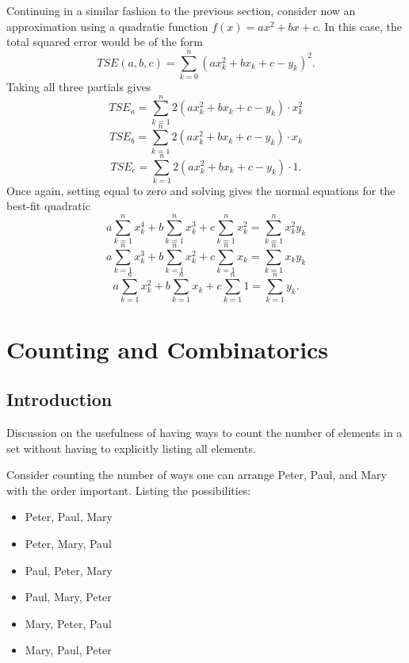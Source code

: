 \documentclass[10pt,]{book}
\theoremstyle{plain}
\theoremstyle{definition}
\theoremstyle{definition}
\theoremstyle{definition}
\numberwithin{equation}{section}
\begin{document}
Continuing in a similar fashion to the previous section, consider now an approximation using a quadratic function \(f(x) = ax^2 + bx + c\).  In this case, the total squared error would be of the form
\begin{equation*}TSE(a,b,c) = \sum_{k=0}^n (a x_k^2 + b x_k + c - y_k)^2.\end{equation*}
Taking all three partials gives
\begin{equation*}TSE_a = \sum_{k=1}^n 2(a x_k^2 + b x_k + c - y_k) \cdot x_k^2\end{equation*}
\begin{equation*}TSE_b = \sum_{k=1}^n 2(a x_k^2 + b x_k + c - y_k) \cdot x_k\end{equation*}
\begin{equation*}TSE_c = \sum_{k=1}^n 2(a x_k^2 + b x_k + c - y_k) \cdot 1 .\end{equation*}
Once again, setting equal to zero and solving gives the normal equations for the best-fit quadratic
\begin{equation*}a \sum_{k=1}^n x_k^4 + b \sum_{k=1}^n x_k^3 + c \sum_{k=1}^n x_k^2 = \sum_{k=1}^n x_k^2 y_k\end{equation*}
\begin{equation*}a \sum_{k=1}^n x_k^3 + b \sum_{k=1}^n x_k^2 + c \sum_{k=1}^n x_k = \sum_{k=1}^n x_k y_k\end{equation*}
\begin{equation*}a \sum_{k=1}^n x_k^2 + b \sum_{k=1}^n x_k + c \sum_{k=1}^n 1 = \sum_{k=1}^n y_k.\end{equation*}


%
\typeout{************************************************}
\typeout{************************************************}
\chapter[{Counting and Combinatorics}]{Counting and Combinatorics}\label{Combinatorics}
\typeout{************************************************}
\typeout{************************************************}
\section[{Introduction}]{Introduction}\label{section-13}
Discussion on the usefulness of having ways to count the number
of elements in a set without having to explicitly listing all elements.%
\par
Consider counting the number of ways one can arrange Peter, Paul, and Mary with the order important.  Listing the possibilities:
\leavevmode%
\begin{itemize}[label=\textbullet]
\item{}Peter, Paul, Mary%
\item{}Peter, Mary, Paul%
\item{}Paul, Peter, Mary%
\item{}Paul, Mary, Peter%
\item{}Mary, Peter, Paul%
\item{}Mary, Paul, Peter%
\end{itemize}
\end{document}
